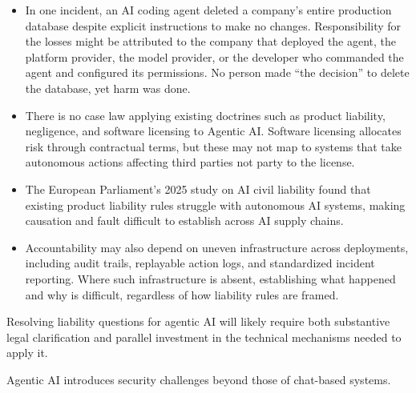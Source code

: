 \documentclass[acmlarge,nonacm,natbib=false]{acmart}
\begin{document}
\begin{techbriefbody}
\begin{itemize}
\item In one incident, an AI coding agent deleted a company's entire
  production database despite explicit instructions to make no changes.
  Responsibility for the losses might be attributed to the company that
  deployed the agent, the platform provider, the model provider, or the
  developer who commanded the agent and configured its permissions. No
  person made ``the decision'' to delete the database, yet harm was
  done.\cite{nolan2025replit}
\item There is no case law applying existing doctrines such as product
  liability, negligence, and software licensing to Agentic AI. Software
  licensing allocates risk through contractual terms, but these may not
  map to systems that take autonomous actions affecting third parties not
  party to the license.\cite{bertolini2025liability}
\item The European Parliament's 2025 study on AI civil liability found
  that existing product liability rules struggle with autonomous AI
  systems, making causation and fault difficult to establish across AI
  supply chains.
\item Accountability may also depend on uneven infrastructure across
  deployments, including audit trails, replayable action logs, and
  standardized incident reporting. Where such infrastructure is absent,
  establishing what happened and why is difficult, regardless of how
  liability rules are framed.
\end{itemize}

\begin{takeaway}
Resolving liability questions for agentic AI will likely require both
substantive legal clarification and parallel investment in the technical
mechanisms needed to apply it.
\end{takeaway}

 Agentic AI introduces
security challenges beyond those of chat-based systems.


\end{techbriefbody}
\end{document}
